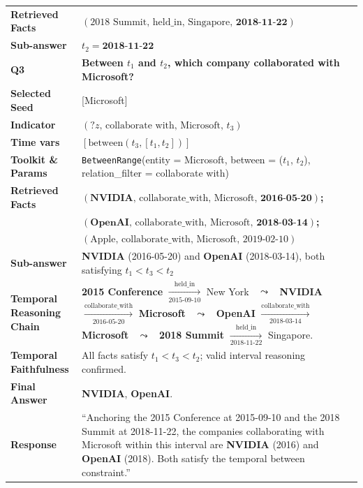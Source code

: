 \begin{table}[t]
\begin{tabularx}{0.97\textwidth}{@{}p{4.3cm}X@{}}
\textbf{Retrieved Facts} & 
\textbf{$(\text{2018 Summit},\,\text{held\_in},\,\text{Singapore},\,\textbf{2018-11-22})$} \\
\textbf{Sub-answer} & $t_2 = \textbf{2018-11-22}$ \\
\midrule
\textbf{Q3} & \textbf{Between $t_1$ and $t_2$, which company collaborated with Microsoft?} \\
\textbf{Selected Seed} & [Microsoft] \\
\textbf{Indicator} & $(?z,\,\text{collaborate with},\,\text{Microsoft},\,t_3)$ \\
\textbf{Time vars} & $[\text{between}(t_3,[t_1,t_2])]$ \\
\textbf{Toolkit \& Params} & \texttt{BetweenRange}(entity = Microsoft, between = ($t_1$, $t_2$), relation\_filter = collaborate with) \\
\textbf{Retrieved Facts} &
\textbf{$(\textbf{NVIDIA},\,\text{collaborate\_with},\,\text{Microsoft},\,\textbf{2016-05-20})$;} \\ &
\textbf{$(\textbf{OpenAI},\,\text{collaborate\_with},\,\text{Microsoft},\,\textbf{2018-03-14})$;} \\ &
$(\text{Apple},\,\text{collaborate\_with},\,\text{Microsoft},\,\text{2019-02-10})$ \\
\textbf{Sub-answer} & \textbf{NVIDIA} (2016-05-20) and \textbf{OpenAI} (2018-03-14), both satisfying $t_1<t_3<t_2$ \\
\toprule
\textbf{Temporal Reasoning Chain} &
\textbf{2015 Conference} $\xrightarrow[\text{2015-09-10}]{\text{held\_in}}$ New York 
$\;\;\leadsto\;\;$ \textbf{NVIDIA} $\xrightarrow[\text{2016-05-20}]{\text{collaborate\_with}}$ \textbf{Microsoft} 
$\;\;\leadsto\;\;$ \textbf{OpenAI} $\xrightarrow[\text{2018-03-14}]{\text{collaborate\_with}}$ \textbf{Microsoft} 
$\;\;\leadsto\;\;$ \textbf{2018 Summit} $\xrightarrow[\text{2018-11-22}]{\text{held\_in}}$ Singapore. \\
\textbf{Temporal Faithfulness} & All facts satisfy $t_1 < t_3 < t_2$; valid interval reasoning confirmed. \\
\textbf{Final Answer} & \textbf{NVIDIA}, \textbf{OpenAI}. \\
\textbf{Response} &
“Anchoring the 2015 Conference at 2015-09-10 and the 2018 Summit at 2018-11-22, the companies collaborating with Microsoft within this interval are \textbf{NVIDIA} (2016) and \textbf{OpenAI} (2018). Both satisfy the temporal between constraint.” \\
\bottomrule
\end{tabularx}
\end{table}

